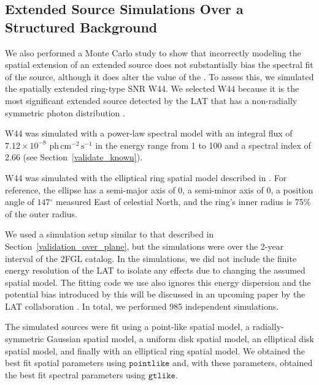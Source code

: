 \documentclass[12pt,preprint]{aastex}
\newcommand{\gev}{\text{GeV}\xspace}
\newcommand{\phflux}{\ensuremath{\text{ph}\,\text{cm}^{-2}\,\text{s}^{-1}}\xspace}
\newcommand{\ts}{\text{TS}\xspace}
\newcommand{\gtlike}{\ensuremath{\mathtt{gtlike}}\xspace}
\newcommand{\pointlike}{\ensuremath{\mathtt{pointlike}}\xspace}
\newcommand{\degree}{\ensuremath{^\circ}\xspace}
\begin{document}
\subsection{Extended Source Simulations Over a Structured Background}
\label{bias_wrong_spatial_model}

We also performed a Monte Carlo study to show that incorrectly modeling the
spatial extension of an extended source does not substantially bias
the spectral fit of the source, although it does alter the value of the \ts.
To assess this, we simulated the spatially extended ring-type SNR W44.
We selected W44 because it is the most significant extended source detected by the LAT 
that has a non-radially symmetric photon distribution \citep{w44}. 

W44 was simulated with a power-law spectral model with an integral flux
of $7.12\times10^{-8}$ \phflux in the energy range from 1 \gev to 100
\gev and a spectral index of 2.66 (see Section~\ref{validate_known}).

W44 was simulated with the elliptical ring spatial model described in
\cite{w44}. For reference, the ellipse has a semi-major axis of 0,
a semi-minor axis of 0, a position angle of $147\degree$
measured East of celestial North, and the ring's inner radius is 75\% of
the outer radius.

We used a simulation setup similar to that described in
Section~\ref{validation_over_plane}, but the simulations
were over the 2-year interval of the 2FGL catalog.
In the simulations, 
we did not include the finite energy resolution of the LAT
to isolate any effects due to changing the assumed spatial model. 
The fitting code we use also ignores this energy dispersion and the
potential bias introduced by this will be discussed in an upcoming paper
by the LAT collaboration \citep{lat_on_orbit_psf}.
In total, we performed 985 independent simulations.

The simulated sources were fit using a point-like spatial model,
a radially-symmetric Gaussian spatial model, a uniform disk spatial model, 
an elliptical disk spatial model, and finally with an elliptical
ring spatial model.
We obtained the best fit spatial parameters using \pointlike and, 
with these parameters, obtained the best fit spectral parameters 
using \gtlike. 
\end{document}
